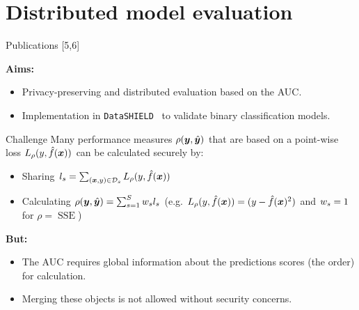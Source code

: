 \documentclass[t,10pt]{beamer}
\begin{document}
\section{Distributed model evaluation}

\begin{frame}{Publications [5,6]}
  \vspace{-0.2cm}
  \begin{figure}
    \centering
  \end{figure}
  \vspace{-0.4cm}

  \textbf{Aims:}
  \begin{itemize}
    \item
      Privacy-preserving and distributed evaluation based on the AUC.
    \item
      Implementation in \texttt{DataSHIELD}~\citep{gaye2014datashield} to validate binary classification models.
  \end{itemize}
\end{frame}

\begin{frame}{Challenge}
  Many performance measures $\rho(\bm{y}, \hat{\bm{y}})$ that are based on a point-wise loss $L_\rho(y, \hat{f}(\bm{x}))$ can be calculated securely by:
  \begin{itemize}
    \item Sharing $l_s = \sum_{(\bm{x}, y)\in\mathcal{D}_s} L_\rho(y,\hat{f}(\bm{x}))$
    \item Calculating $\rho(\bm{y},\hat{\bm{y}}) = \sum_{s=1}^S w_s l_s$ (e.g. $L_\rho(y,\hat{f}(\bm{x})) = (y - \hat{f}(\bm{x})^2)$ and $w_s = 1$ for $\rho = \operatorname{SSE}$)
  \end{itemize}
\textbf{But:}
  \begin{itemize}
    \item The AUC requires global information about the predictions scores (the order) for calculation.
    \item Merging these objects is not allowed without security concerns.
  \end{itemize}
\end{frame}
\end{document}
